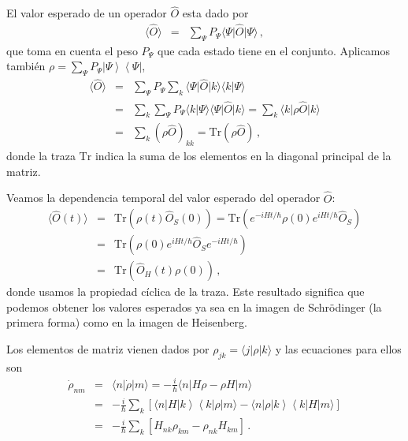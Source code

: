 \documentclass[twocolumn,aps,eqsecnum]{revtex4}
\newcommand{\Tr}{\mathrm{Tr}}
\providecommand{\vxp}[1]{\langle #1 \rangle}
\providecommand{\bra}[1]{\langle #1 \rvert}
\providecommand{\ket}[1]{\lvert #1 \rangle}
\providecommand{\braket}[2]{\langle #1 \rvert #2 \rangle}
\newcommand{\ketbra}[2]{\left| {#1} \right\rangle\left\langle {#2}\right|}
\begin{document}
El valor esperado de un operador $\hat{O}$ esta dado por  
%
\begin{eqnarray}
\vxp{\hat{O}} &=& \sum_{\Psi} P_{\Psi} \bra{\Psi} \hat{O}\ket{\Psi}  \,,
\end{eqnarray}
que toma en cuenta el peso $P_{\Psi}$ que cada estado tiene en el conjunto. 
Aplicamos tambi\'en  
$\rho = \sum_{\Psi} P_{\Psi} \ketbra{\Psi}{\Psi}$, 
%
\begin{eqnarray}
\vxp{\hat{O}} &=&  \sum_{\Psi} P_{\Psi} \sum_k \bra{\Psi} \hat{O}\ket{k}
		\braket{k}{\Psi} 	\nonumber \\ 
&=& \sum_k \sum_{\Psi} P_{\Psi} \braket{k}{\Psi}  \bra{\Psi} \hat{O}\ket{k} 
	= \sum_k \bra{k} \rho \hat{O} \ket{k} 	\nonumber  \\ 
&=& \sum_k ( \rho \hat{O} )_{kk} 	= \Tr ( \rho \hat{O} ) \,,
\end{eqnarray}
donde la traza $\Tr$ indica la suma de los elementos en la diagonal principal 
de la matriz. 

Veamos la dependencia temporal del valor esperado del operador 
$\hat{O}$: 
%
\begin{eqnarray}
\vxp{\hat{O}(t)} &=& \Tr ( \rho(t) \hat{O}_S(0) ) 	
	=  \Tr ( e^{-iHt/\hbar} \rho(0)  e^{iHt/\hbar} \hat{O}_S ) \nonumber \\ 
	&=& \Tr (  \rho(0)  e^{iHt/\hbar} \hat{O}_S e^{-iHt/\hbar} ) \nonumber \\
	&=& \Tr ( \hat{O}_H(t) \rho(0) ) \,, 
\end{eqnarray}
donde usamos la propiedad c\'iclica de la traza. Este resultado significa 
que podemos obtener los valores esperados ya sea en la imagen de 
Schr\"odinger (la primera forma) como en la imagen de Heisenberg.

Los elementos de matriz vienen dados por 
$\rho_{jk} = \bra{j} \rho \ket{k}$ y las ecuaciones para ellos son 
%
\begin{eqnarray}
\dot{\rho}_{nm} &=& \bra{n} \dot{\rho} \ket{m} 
	= - \frac{i}{\hbar}  \bra{n}  H \rho -\rho H \ket{m}		\nonumber \\ 
&=& - \frac{i}{\hbar} \sum_k \left[  
	\bra{n}  H \ketbra{k}{k} \rho \ket{m} 
	-  \bra{n} \rho \ketbra{k}{k}  H \ket{m}  \right] 	\nonumber \\ 
&=& - \frac{i}{\hbar} \sum_k \left[ H_{nk} \rho_{km} - \rho_{nk} H_{km} \right] \,.
\end{eqnarray}
\end{document}
